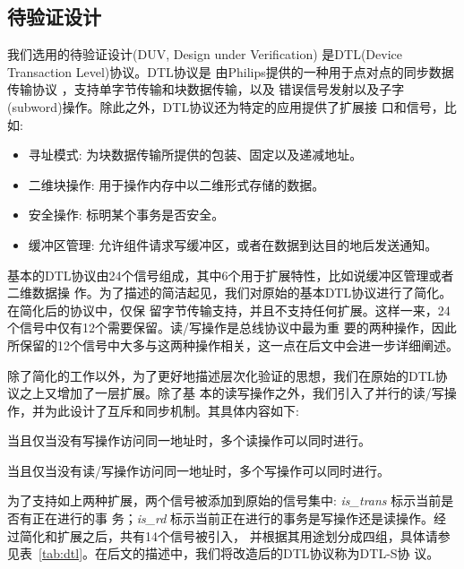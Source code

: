 \subsection{待验证设计}
\label{sec:hierarchy-duv}

我们选用的待验证设计(DUV, Design under Verification) 是DTL(Device Transaction Level)协议。DTL协议是
由Philips提供的一种用于点对点的同步数据传输协议 \cite{DATE09_Moll}，支持单字节传输和块数据传输，以及
错误信号发射以及子字(subword)操作。除此之外，DTL协议还为特定的应用提供了扩展接
口和信号，比如:

\begin{itemize}
  \item 寻址模式: 为块数据传输所提供的包装、固定以及递减地址。
  \item 二维块操作: 用于操作内存中以二维形式存储的数据。
  \item 安全操作: 标明某个事务是否安全。
  \item 缓冲区管理: 允许组件请求写缓冲区，或者在数据到达目的地后发送通知。
\end{itemize}

基本的DTL协议由24个信号组成，其中6个用于扩展特性，比如说缓冲区管理或者二维数据操
作\cite{Book_Pasricha}。为了描述的简洁起见，我们对原始的基本DTL协议进行了简化。在简化后的协议中，仅保
留字节传输支持，并且不支持任何扩展。这样一来，24个信号中仅有12个需要保留。读/写操作是总线协议中最为重
要的两种操作，因此所保留的12个信号中大多与这两种操作相关，这一点在后文中会进一步详细阐述。

除了简化的工作以外，为了更好地描述层次化验证的思想，我们在原始的DTL协议之上又增加了一层扩展。除了基
本的读写操作之外，我们引入了并行的读/写操作，并为此设计了互斥和同步机制。其具体内容如下:

\begin{extension} \label{extension:multi-read}
当且仅当没有写操作访问同一地址时，多个读操作可以同时进行。
\end{extension}
\begin{extension} \label{extension:multi-write}
当且仅当没有读/写操作访问同一地址时，多个写操作可以同时进行。
\end{extension}


为了支持如上两种扩展，两个信号被添加到原始的信号集中: {\em is\_trans} 标示当前是否有正在进行的事
务；{\em is\_rd} 标示当前正在进行的事务是写操作还是读操作。经过简化和扩展之后，共有14个信号被引入，
并根据其用途划分成四组，具体请参见表~\ref{tab:dtl}。在后文的描述中，我们将改造后的DTL协议称为DTL-S协
议。

